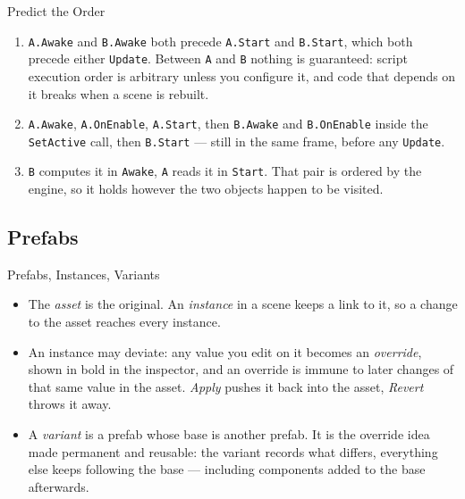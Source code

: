 \begin{solutionframe}{Predict the Order}
    \begin{enumerate}
        \item \texttt{A.Awake} and \texttt{B.Awake} both precede
        \texttt{A.Start} and \texttt{B.Start}, which both precede either
        \texttt{Update}. Between \texttt{A} and \texttt{B} nothing is
        guaranteed: script execution order is arbitrary unless you configure it,
        and code that depends on it breaks when a scene is rebuilt.
        \item \texttt{A.Awake}, \texttt{A.OnEnable}, \texttt{A.Start}, then
        \texttt{B.Awake} and \texttt{B.OnEnable} inside the
        \texttt{SetActive} call, then \texttt{B.Start} --- still in the same
        frame, before any \texttt{Update}.
        \item \texttt{B} computes it in \texttt{Awake}, \texttt{A} reads it in
        \texttt{Start}. That pair is ordered by the engine, so it holds however
        the two objects happen to be visited.
    \end{enumerate}
\end{solutionframe}

\subsection{Prefabs}

\begin{frame}{Prefabs, Instances, Variants}
    \begin{itemize}
        \item The \emph{asset} is the original. An \emph{instance} in a scene
        keeps a link to it, so a change to the asset reaches every instance.
        \item An instance may deviate: any value you edit on it becomes an
        \emph{override}, shown in bold in the inspector, and an override is
        immune to later changes of that same value in the asset. \emph{Apply}
        pushes it back into the asset, \emph{Revert} throws it away.
        \item A \emph{variant} is a prefab whose base is another prefab. It is the
        override idea made permanent and reusable: the variant records what
        differs, everything else keeps following the base --- including
        components added to the base afterwards.
    \end{itemize}
    \vspace{2ex}

\end{frame}

